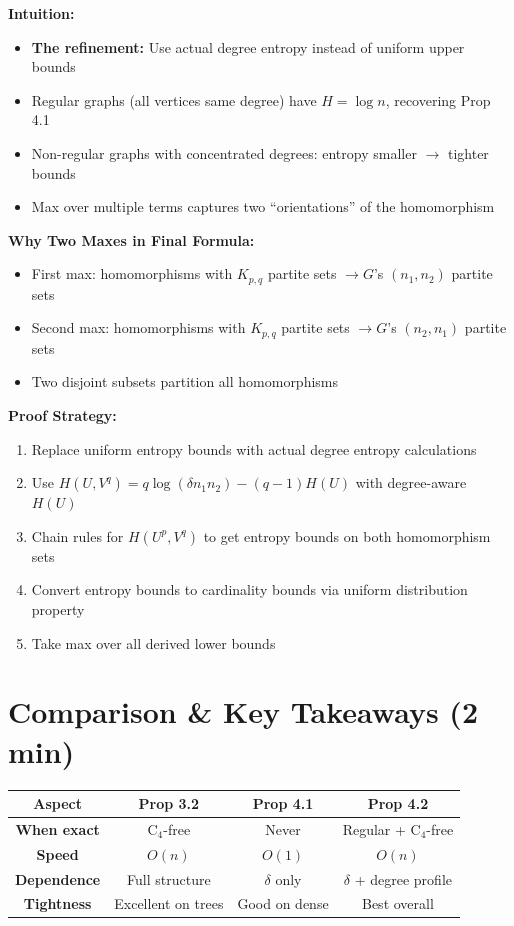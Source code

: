 \documentclass[12pt,a4paper]{article}
\begin{document}
\textbf{Intuition:}
\begin{itemize}
    \item \textbf{The refinement:} Use actual degree entropy instead of uniform upper bounds
    \item Regular graphs (all vertices same degree) have $H=\log n$, recovering Prop 4.1
    \item Non-regular graphs with concentrated degrees: entropy smaller $\to$ tighter bounds
    \item Max over multiple terms captures two ``orientations'' of the homomorphism
\end{itemize}

\textbf{Why Two Maxes in Final Formula:}
\begin{itemize}
    \item First max: homomorphisms with $K_{p,q}$ partite sets $\to G$'s $(n_1,n_2)$ partite sets
    \item Second max: homomorphisms with $K_{p,q}$ partite sets $\to G$'s $(n_2,n_1)$ partite sets
    \item Two disjoint subsets partition all homomorphisms
\end{itemize}

\textbf{Proof Strategy:}
\begin{enumerate}
    \item Replace uniform entropy bounds with actual degree entropy calculations
    \item Use $H(U,V^q) = q\log(\delta n_1 n_2) - (q-1)H(U)$ with degree-aware $H(U)$
    \item Chain rules for $H(U^p,V^q)$ to get entropy bounds on both homomorphism sets
    \item Convert entropy bounds to cardinality bounds via uniform distribution property
    \item Take max over all derived lower bounds
\end{enumerate}

\section{Comparison \& Key Takeaways (2 min)}

\begin{tabular}{|c|c|c|c|}
\hline
\textbf{Aspect} & \textbf{Prop 3.2} & \textbf{Prop 4.1} & \textbf{Prop 4.2} \\
\hline
\textbf{When exact} & C$_4$-free & Never & Regular + C$_4$-free \\
\hline
\textbf{Speed} & $O(n)$ & $O(1)$ & $O(n)$ \\
\hline
\textbf{Dependence} & Full structure & $\delta$ only & $\delta$ + degree profile \\
\hline
\textbf{Tightness} & Excellent on trees & Good on dense & Best overall \\
\hline
\end{tabular}
\end{document}
